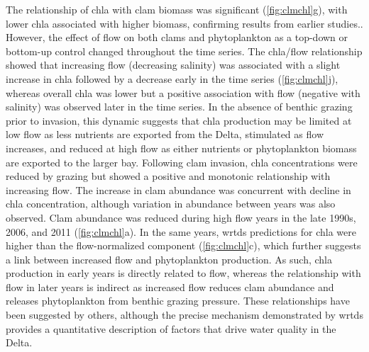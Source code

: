 \documentclass[journal = esthag, manuscript = article]{achemso}\usepackage[]{graphicx}\usepackage[]{color}
\begin{document}
The relationship of \ac{chla} with clam biomass was significant (\cref{fig:clmchl}g), with lower \ac{chla} associated with higher biomass, confirming results from earlier studies.\cite{Alpine92,Thompson08}.  However, the effect of flow on both clams and phytoplankton as a top-down or bottom-up control changed throughout the time series.  The \ac{chla}/flow relationship showed that increasing flow (decreasing salinity) was associated with a slight increase in \ac{chla} followed by a decrease early in the time series (\cref{fig:clmchl}j), whereas overall \ac{chla} was lower but a positive association with flow (negative with salinity) was observed later in the time series. In the absence of benthic grazing prior to invasion, this dynamic suggests that \ac{chla} production may be limited at low flow as less nutrients are exported from the Delta, stimulated as flow increases, and reduced at high flow as either nutrients or phytoplankton biomass are exported to the larger bay. Following clam invasion, \ac{chla} concentrations were reduced by grazing but showed a positive and monotonic relationship with increasing flow. The increase in clam abundance was concurrent with decline in \ac{chla} concentration, although variation in abundance between years was also observed.  Clam abundance was reduced during high flow years in the late 1990s, 2006, and 2011 (\ref{fig:clmchl}a). In the same years, \ac{wrtds} predictions for \ac{chla} were higher than the flow-normalized component (\cref{fig:clmchl}c), which further suggests a link between increased flow and phytoplankton production.  As such, \ac{chla} production in early years is directly related to flow, whereas the relationship with flow in later years is indirect as increased flow reduces clam abundance and releases phytoplankton from benthic grazing pressure. These relationships have been suggested by others\cite{Alpine92,Parchaso02,Jassby08}, although the precise mechanism demonstrated by \ac{wrtds} provides a quantitative description of factors that drive water quality in the Delta.
\end{document}
